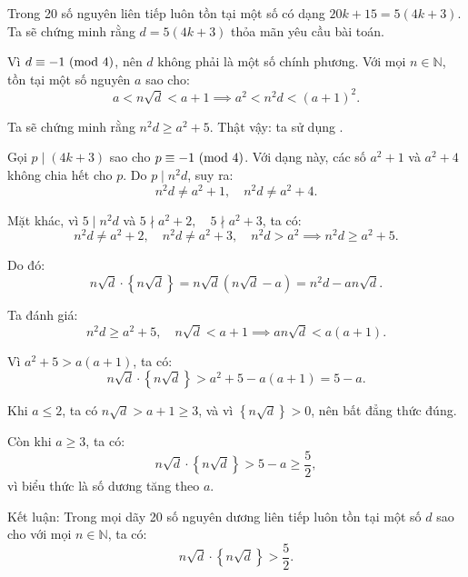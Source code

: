 \documentclass[../03-arithmetic-functions.tex]{subfiles}
\begin{document}
\begin{soln}\footnotemark
    Trong 20 số nguyên liên tiếp luôn tồn tại một số có dạng \( 20k + 15 = 5(4k + 3) \). Ta sẽ chứng minh rằng \( d = 5(4k + 3) \) thỏa mãn yêu cầu bài toán.

    Vì \( d \equiv -1 \ (\mathrm{mod}\ 4) \), nên \( d \) không phải là một số chính phương. Với mọi \( n \in \mathbb{N} \), tồn tại một số nguyên \( a \) sao cho:
    \[
        a < n\sqrt{d} < a + 1 \implies a^2 < n^2 d < (a + 1)^2.
    \]

    Ta sẽ chứng minh rằng \( n^2 d \geq a^2 + 5 \). Thật vậy: ta sử dụng .

    Gọi \( p \mid (4k + 3) \) sao cho \( p \equiv -1 \ (\mathrm{mod}\ 4) \). Với dạng này, các số \( a^2 + 1 \) và \( a^2 + 4 \) không chia hết cho \( p \). Do \( p \mid n^2 d \), suy ra:
    \[
        n^2 d \ne a^2 + 1, \quad n^2 d \ne a^2 + 4.
    \]

    Mặt khác, vì \( 5 \mid n^2 d \) và \( 5 \nmid a^2 + 2, \quad 5 \nmid a^2 + 3 \), ta có:
    \[
        n^2 d \ne a^2 + 2, \quad n^2 d \ne a^2 + 3, \quad  n^2 d > a^2 \implies n^2 d \geq a^2 + 5.
    \]

    Do đó:
    \[
        n\sqrt{d} \cdot \left\{n\sqrt{d}\right\}
        = n\sqrt{d}(n\sqrt{d} - a)
        = n^2 d - a n\sqrt{d}.
    \]

    Ta đánh giá:
    \[
        n^2 d \geq a^2 + 5, \quad n\sqrt{d} < a + 1 \implies a n\sqrt{d} < a(a + 1).
    \]

    Vì \( a^2 + 5 > a(a + 1) \), ta có:
    \[
        n\sqrt{d} \cdot \left\{n\sqrt{d}\right\} > a^2 + 5 - a(a + 1) = 5 - a.
    \]

    Khi \( a \leq 2 \), ta có \( n\sqrt{d} > a + 1 \geq 3 \), và vì \( \left\{ n\sqrt{d} \right\} > 0 \), nên bất đẳng thức đúng.

    Còn khi \( a \geq 3 \), ta có:
    \[
        n\sqrt{d} \cdot \left\{n\sqrt{d}\right\} > 5 - a \geq \frac{5}{2},
    \]
    vì biểu thức là số dương tăng theo \( a \).

    Kết luận: Trong mọi dãy 20 số nguyên dương liên tiếp luôn tồn tại một số \( d \) sao cho với mọi \( n \in \mathbb{N} \), ta có:
    \[
        n\sqrt{d} \cdot \left\{n\sqrt{d}\right\} > \frac{5}{2}.
    \]
\end{soln}

\end{document}
